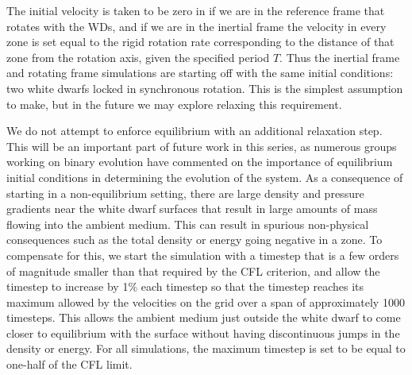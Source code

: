 \documentclass[iop]{emulateapj}
\begin{document}
The initial velocity is taken to be zero in if we are in the reference
frame that rotates with the WDs, and if we are in the inertial frame
the velocity in every zone is set equal to the rigid rotation rate 
corresponding to the distance of that zone from the rotation axis, given
the specified period $T$. Thus the inertial frame and rotating frame 
simulations are starting off with the same initial conditions: two white 
dwarfs locked in synchronous rotation. This is the simplest assumption to 
make, but in the future we may explore relaxing this requirement.

We do not attempt to enforce equilibrium with an additional relaxation
step. This will be an important part of future work in this series, as
numerous groups working on binary evolution
\citep{swc:2000,motl:2002,rosswog:2004,dan:2011,pakmor:2012:gadget}
have commented on the importance of equilibrium initial conditions in
determining the evolution of the system. As a consequence of starting 
in a non-equilibrium setting, there are 
large density and pressure gradients near the white dwarf surfaces
that result in large amounts of mass flowing into the ambient
medium. This can result in spurious non-physical consequences such as 
the total density or energy going negative in a zone. To compensate 
for this, we start the simulation with a timestep that is a few orders 
of magnitude smaller than that required by the CFL criterion, and allow
the timestep to increase by 1\% each timestep so that the timestep reaches 
its maximum allowed by the velocities on the grid over a span of approximately 
1000 timesteps. This allows the ambient medium just outside the white dwarf
to come closer to equilibrium with the surface without having 
discontinuous jumps in the density or energy. For all simulations, 
the maximum timestep is set to be equal to one-half of the CFL limit.
\end{document}
